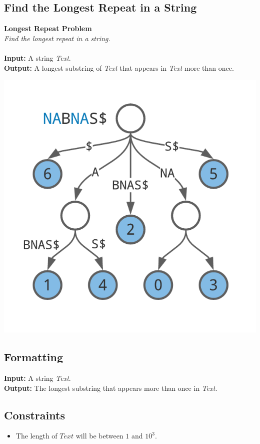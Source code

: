 \documentclass{article}
\begin{document}
\subsection{Find the Longest Repeat in a String}
\hline\vspace{5}
\textbf{Longest Repeat Problem}\\
\emph{Find the longest repeat in a string.}\\ \\
\textbf{Input:} A string \emph{Text}.\\
\textbf{Output:} A longest substring of \emph{Text} that appears in \emph{Text} more than once.
\begin{center}
    \includegraphics[scale=0.2]{c9/logos/9D.png} 
\end{center}
\hline\vspace{5}

\subsection*{Formatting}
\noindent\textbf{Input:} A string \emph{Text}.\\
\noindent\textbf{Output:} The longest substring that appears more than once in \emph{Text}.

\subsection*{Constraints}
\begin{itemize}
    \item The length of $Text$ will be between $1$ and $10^3$.
\end{itemize}
\end{document}
